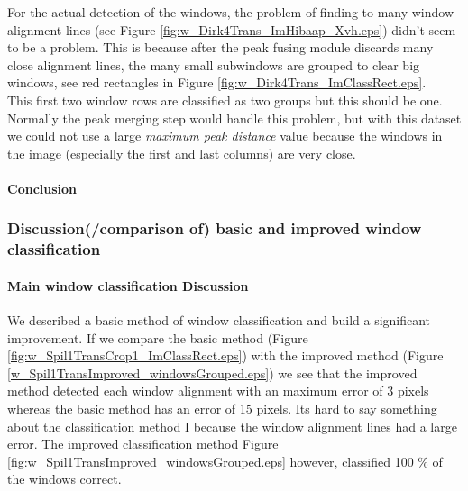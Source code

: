 For the actual detection of the windows, the problem of finding to many window alignment lines
(see Figure \ref{fig:w_Dirk4Trans_ImHibaap_Xvh.eps})
didn't seem to be a problem. This is because after the peak fusing module discards many close alignment lines, the
many small subwindows are grouped to clear big windows, see red rectangles in Figure
\ref{fig:w_Dirk4Trans_ImClassRect.eps}.\\


This first two window rows are classified as two groups but this should be one.
Normally the peak merging step would handle this problem, but with this dataset
we could not use a large \emph{maximum peak distance} value because the windows
in the image (especially the first and last columns) are very close.




\paragraph{Conclusion} %





\subsubsection{Discussion(/comparison of) basic and improved window classification}
\paragraph{Main window classification Discussion}
We described a basic method of window classification and build a significant improvement.
If we compare the basic method (Figure \ref{fig:w_Spil1TransCrop1_ImClassRect.eps})
with the improved method (Figure \ref{w_Spil1TransImproved_windowsGrouped.eps})
we see that the improved method detected each window alignment with an maximum
error of 3 pixels whereas the basic method has an error of 15 pixels.  Its hard
to say something about the classification method I because the window alignment
lines had a large error.
The improved classification method Figure
\ref{fig:w_Spil1TransImproved_windowsGrouped.eps} however, classified 100 \% of
the windows correct.



